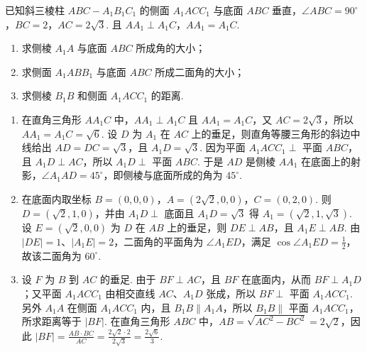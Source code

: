 \documentclass[UTF8,a4paper,oneside,11pt]{ctexbook}
\begin{document}
\begin{problem}
已知斜三棱柱 \(ABC - A_{1}B_{1}C_{1}\) 的侧面 \(A_{1}ACC_{1}\) 与底面 \(ABC\) 垂直，\(\angle ABC = 90^{\circ}\)，\(BC = 2\)，\(AC = 2\sqrt{3}\). 且 \(AA_{1} \perp A_{1}C\)，\(AA_{1} = A_{1}C\).

\begin{enumerate}
\item 求侧棱 \(A_{1}A\) 与底面 \(ABC\) 所成角的大小；
\item 求侧面 \(A_{1}ABB_{1}\) 与底面 \(ABC\) 所成二面角的大小；
\item 求侧棱 \(B_{1}B\) 和侧面 \(A_{1}ACC_{1}\) 的距离.
\end{enumerate}

\end{problem}

\begin{solution}
\begin{enumerate}
\item 在直角三角形 \(AA_1C\) 中，\(AA_1\perp A_1C\) 且 \(AA_1=A_1C\)，又 \(AC=2\sqrt{3}\)，所以 \(AA_1=A_1C=\sqrt{6}\). 设 \(D\) 为 \(A_1\) 在 \(AC\) 上的垂足，则直角等腰三角形的斜边中线给出 \(AD=DC=\sqrt{3}\)，且 \(A_1D=\sqrt{3}\). 因为平面 \(A_1ACC_1\perp\) 平面 \(ABC\)，且 \(A_1D\perp AC\)，所以 \(A_1D\perp\) 平面 \(ABC\). 于是 \(AD\) 是侧棱 \(AA_1\) 在底面上的射影，\(\angle A_1AD=45^{\circ}\)，即侧棱与底面所成的角为 \(45^{\circ}\).
\item 在底面内取坐标 \(B=(0,0,0)\)，\(A=(2\sqrt{2},0,0)\)，\(C=(0,2,0)\). 则 \(D=(\sqrt{2},1,0)\)，并由 \(A_1D\perp\) 底面且 \(A_1D=\sqrt{3}\) 得 \(A_1=(\sqrt{2},1,\sqrt{3})\). 设 \(E=(\sqrt{2},0,0)\) 为 \(D\) 在 \(AB\) 上的垂足，则 \(DE\perp AB\)，且 \(A_1E\perp AB\). 由 \(|DE|=1\)、\(|A_1E|=2\)，二面角的平面角为 \(\angle A_1ED\)，满足 \(\cos\angle A_1ED=\frac{1}{2}\)，故该二面角为 \(60^{\circ}\).
\item 设 \(F\) 为 \(B\) 到 \(AC\) 的垂足. 由于 \(BF\perp AC\)，且 \(BF\) 在底面内，从而 \(BF\perp A_1D\)；又平面 \(A_1ACC_1\) 由相交直线 \(AC\)、\(A_1D\) 张成，所以 \(BF\perp\) 平面 \(A_1ACC_1\). 另外 \(A_1A\) 在侧面 \(A_1ACC_1\) 内，且 \(B_1B\parallel A_1A\)，所以 \(B_1B\parallel\) 平面 \(A_1ACC_1\)，所求距离等于 \(|BF|\). 在直角三角形 \(ABC\) 中，\(AB=\sqrt{AC^2-BC^2}=2\sqrt{2}\)，因此 \(|BF|=\frac{AB\cdot BC}{AC}=\frac{2\sqrt{2}\cdot2}{2\sqrt{3}}=\frac{2\sqrt{6}}{3}\).
\end{enumerate}
\end{solution}
\end{document}
